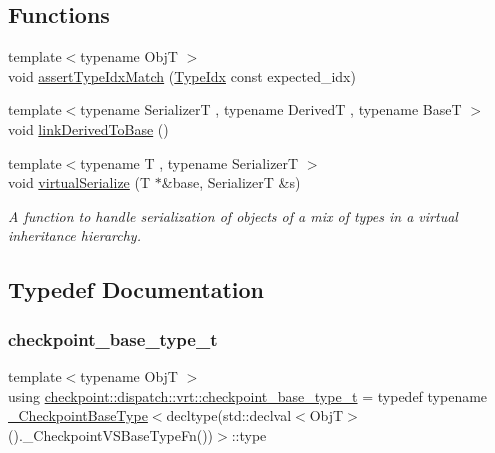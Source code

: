 \subsection*{Functions}
\begin{DoxyCompactItemize}
\item 
{\footnotesize template$<$typename ObjT $>$ }\\void \hyperlink{namespacecheckpoint_1_1dispatch_1_1vrt_a1edd0d1d99a9d53058715b72e8aa7f38}{assert\+Type\+Idx\+Match} (\hyperlink{namespacecheckpoint_1_1dispatch_1_1vrt_acd3f9e6b091bcfbc23dc35ea8ef45d3b}{Type\+Idx} const expected\+\_\+idx)
\item 
{\footnotesize template$<$typename SerializerT , typename DerivedT , typename BaseT $>$ }\\void \hyperlink{namespacecheckpoint_1_1dispatch_1_1vrt_a386bc0347756889ae1d3849cf351110e}{link\+Derived\+To\+Base} ()
\item 
{\footnotesize template$<$typename T , typename SerializerT $>$ }\\void \hyperlink{namespacecheckpoint_1_1dispatch_1_1vrt_ab62fa4e32b27853f6b57caf24b6a77cc}{virtual\+Serialize} (T $\ast$\&base, SerializerT \&s)
\begin{DoxyCompactList}\small\item\em A function to handle serialization of objects of a mix of types in a virtual inheritance hierarchy. \end{DoxyCompactList}\end{DoxyCompactItemize}


\subsection{Typedef Documentation}
\mbox{\label{namespacecheckpoint_1_1dispatch_1_1vrt_a41abdf16741a7c58e926d9813985bd2f}} 
\subsubsection{\texorpdfstring{checkpoint\+\_\+base\+\_\+type\+\_\+t}{checkpoint\_base\_type\_t}}
{\footnotesize\ttfamily template$<$typename ObjT $>$ \\
using \hyperlink{namespacecheckpoint_1_1dispatch_1_1vrt_a41abdf16741a7c58e926d9813985bd2f}{checkpoint\+::dispatch\+::vrt\+::checkpoint\+\_\+base\+\_\+type\+\_\+t} = typedef typename \hyperlink{structcheckpoint_1_1dispatch_1_1vrt_1_1___checkpoint_base_type}{\+\_\+\+Checkpoint\+Base\+Type}$<$decltype(std\+::declval$<$ObjT$>$().\+\_\+\+Checkpoint\+V\+S\+Base\+Type\+Fn())$>$\+::type}

